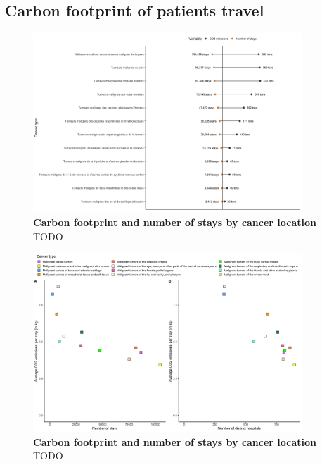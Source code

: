 \subsection{Carbon footprint of patients travel}

\begin{figure}[h!]
    \includegraphics[width=0.9\textwidth]{images/routes/fig12.png}
    \centering
    \caption{
        \textbf{Carbon footprint and number of stays by cancer location}
        TODO }
    \label{fig:carbon-footprint-pathology}
\end{figure}

\begin{figure}[h!]
    \includegraphics[width=0.9\textwidth]{images/routes/sup_fig_4.png}
    \centering
    \caption{
        \textbf{Carbon footprint and number of stays by cancer location}
        TODO }
    \label{fig:avg-carbon-footprint-pathology}
\end{figure}


